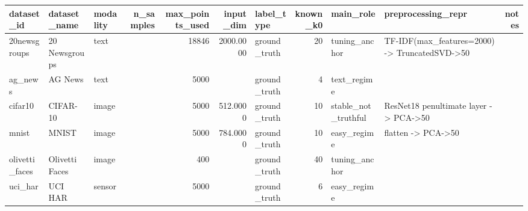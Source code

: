 \begin{tabular}{lllrrrlrllr}
\toprule
dataset_id & dataset_name & modality & n_samples & max_points_used & input_dim & label_type & known_k0 & main_role & preprocessing_repr & notes \\
\midrule
20newsgroups & 20 Newsgroups & text &  & 18846 & 2000.0000 & ground_truth & 20 & tuning_anchor & TF-IDF(max_features=2000) -> TruncatedSVD->50 &  \\
ag_news & AG News & text &  & 5000 &  & ground_truth & 4 & text_regime &  &  \\
cifar10 & CIFAR-10 & image &  & 5000 & 512.0000 & ground_truth & 10 & stable_not_truthful & ResNet18 penultimate layer -> PCA->50 &  \\
mnist & MNIST & image &  & 5000 & 784.0000 & ground_truth & 10 & easy_regime & flatten -> PCA->50 &  \\
olivetti_faces & Olivetti Faces & image &  & 400 &  & ground_truth & 40 & tuning_anchor &  &  \\
uci_har & UCI HAR & sensor &  & 5000 &  & ground_truth & 6 & easy_regime &  &  \\
\bottomrule
\end{tabular}
